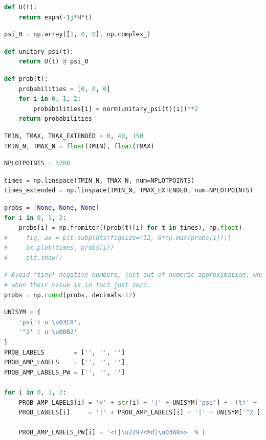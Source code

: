 \begin{lstlisting}[language=Python]
def U(t):
    return expm(-1j*H*t)
\end{lstlisting}

\begin{lstlisting}[language=Python]
psi_0 = np.array([1, 0, 0], np.complex_)
\end{lstlisting}

\begin{lstlisting}[language=Python]
def unitary_psi(t):
    return U(t) @ psi_0
\end{lstlisting}

\begin{lstlisting}[language=Python]
def prob(t):
    probabilities = [0, 0, 0]
    for i in 0, 1, 2:
        probabilities[i] = norm(unitary_psi(t)[i])**2
    return probabilities
\end{lstlisting}

\begin{lstlisting}[language=Python]
TMIN, TMAX, TMAX_EXTENDED = 0, 40, 150
TMIN_N, TMAX_N = float(TMIN), float(TMAX)
\end{lstlisting}

\begin{lstlisting}[language=Python]
NPLOTPOINTS = 3200
\end{lstlisting}

\begin{lstlisting}[language=Python]
times = np.linspace(TMIN_N, TMAX_N, num=NPLOTPOINTS)
times_extended = np.linspace(TMIN_N, TMAX_EXTENDED, num=NPLOTPOINTS)
\end{lstlisting}

\begin{lstlisting}[language=Python]
probs = [None, None, None]
for i in 0, 1, 2:
    probs[i] = np.fromiter((prob(t)[i] for t in times), np.float)
#     fig, ax = plt.subplots(figsize=(12, 6*np.max(probs[i])))
#     ax.plot(times, probs[i])
#     plt.show()
\end{lstlisting}

\begin{lstlisting}[language=Python]
# Avoid *tiny* negative numbers, just out of numeric approximation, which will cause problems later,
# when their value is in fact just zero.
probs = np.round(probs, decimals=12)
\end{lstlisting}

\begin{lstlisting}[language=Python]
UNISYM = {
    'psi': u'\u03C8',
    '^2' : u'\u00B2'
}
PROB_LABELS        = ['', '', '']
PROB_AMP_LABELS    = ['', '', '']
PROB_AMP_LABELS_PW = ['', '', '']

for i in 0, 1, 2:
    PROB_AMP_LABELS[i] = '<' + str(i) + '|' + UNISYM['psi'] + '(t)' + '>'
    PROB_LABELS[i]     = '|' + PROB_AMP_LABELS[i] + '|' + UNISYM['^2']

    PROB_AMP_LABELS_PW[i] = '<t|\u2297<%d|\u03A8>>' % i
\end{lstlisting}

